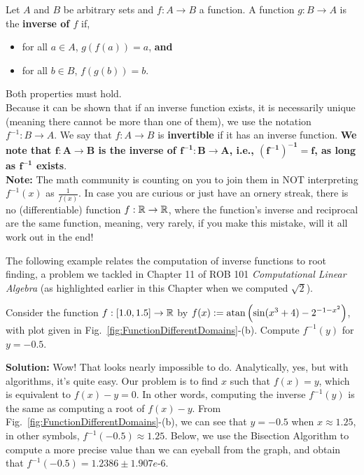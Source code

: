 \begin{tcolorbox}[colback=mylightblue, title = {\bf Inverse of a Function}, breakable]

\begin{definition}
Let $A$ and $B$ be arbitrary sets and $f: A \to B$ a function. A function $g: B \to A$ is the \textbf{inverse of $f$} if,
\begin{itemize}
    \item for all $a \in A$, $g(f(a)) = a$, \textbf{and}
    \item for all $b \in B$, $f(g(b)) = b$.
\end{itemize}
Both properties must hold.\\

Because it can be shown that if an inverse function exists, it is necessarily unique (meaning there cannot be more than one of them), we use the notation $f^{-1}: B \to A$. We say that $f: A \to B$ is \textbf{invertible} if it has an inverse function. \textbf{We note that $\bm{f: A \to B}$ is the inverse of $\bm{f^{-1}: B \to A}$, i.e., $\bm{(f^{-1})^{-1} = f}$, as long as $\bm{f^{-1}}$ exists}.\\

\textbf{Note:} The math community is counting on you to join them in NOT interpreting $f^{-1}(x)$ as $\frac{1}{f(x)}$. In case you are curious or just have an ornery streak, there is no (differentiable) function $f:\mathbb R \to \mathbb R$, where the function's inverse and reciprocal are the same function, meaning, very rarely, if you make this mistake, will it all work out in the end!
\end{definition}
 
\end{tcolorbox}

\bigskip

The following example relates the computation of inverse functions to root finding, a problem we tackled in Chapter 11 of ROB 101 \textit{Computational Linear Algebra} (as highlighted earlier in this Chapter when we computed $\sqrt{2}$).

\begin{example} Consider the function $f: [1.0, 1.5] \to \mathbb R$ by $f(x):= \mathrm{atan}\left( \sin(x^3 + 4) - 2^{-1 - x^2} \right)$, with plot given in Fig.~\ref{fig:FunctionDifferentDomains}-(b). Compute  $f^{-1}(y)$ for $y = -0.5$. 
    
\end{example}

\textbf{Solution:} Wow! That looks nearly impossible to do. Analytically, yes, but with algorithms, it's quite easy. Our problem is to find $x$ such that $f(x)=y$, which is equivalent to $f(x)-y = 0$. In other words, computing the inverse $f^{-1}(y)$ is the same as computing a root of $f(x)-y$. From Fig.~\ref{fig:FunctionDifferentDomains}-(b), we can see that $y=-0.5$ when $x \approx 1.25$, in other symbols, $f^{-1}(-0.5)\approx 1.25$. Below, we use the Bisection Algorithm to compute a more precise value than we can eyeball from the graph, and obtain that $f^{-1}(-0.5)= 1.2386 \pm 1.907e\text{-}6$.

